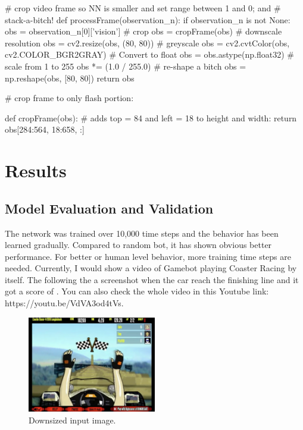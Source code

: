\documentclass[a4paper]{article}
\begin{document}
\begin{python}
# crop video frame so NN is smaller and set range between 1 and 0; and
# stack-a-bitch!
def processFrame(observation_n):
    if observation_n is not None:
        obs = observation_n[0]['vision']
        # crop
        obs = cropFrame(obs)
        # downscale resolution
        obs = cv2.resize(obs, (80, 80))
        # greyscale
        obs = cv2.cvtColor(obs, cv2.COLOR_BGR2GRAY)
        # Convert to float
        obs = obs.astype(np.float32)
        # scale from 1 to 255
        obs *= (1.0 / 255.0)
        # re-shape a bitch
        obs = np.reshape(obs, [80, 80])
    return obs

# crop frame to only flash portion:


def cropFrame(obs):
    # adds top = 84 and left = 18 to height and width:
    return obs[284:564, 18:658, :]
\end{python}

\section{Results}

\subsection{Model Evaluation and Validation}

The network was trained over 10,000 time steps and the behavior has been learned gradually. Compared to random bot, it has shown obvious better performance. For better or human level behavior, more training time steps are needed. Currently, I would show a video of Gamebot playing Coaster Racing by itself. The following the a screenshot when the car reach the finishing line and it got a score of . You can also check the whole video in this Youtube link: https://youtu.be/VdVA3od4tVs.

\begin{figure}[h]
\centering
\includegraphics[width=0.5\textwidth]{high-score-by-gamebot}
\caption{Downsized input image.}
\end{figure}
\end{document}
